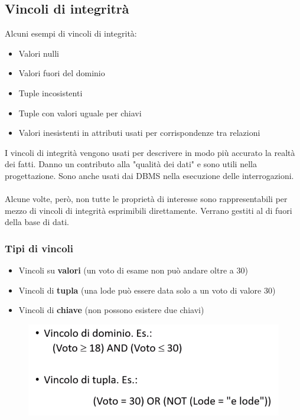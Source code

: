\documentclass[12pt, a4paper]{article}
\begin{document}
    \subsection{Vincoli di integritrà}
    Alcuni esempi di vincoli di integrità:
    \begin{itemize}
        \item Valori nulli
        \item Valori fuori del dominio
        \item Tuple incosistenti 
        \item Tuple con valori uguale per chiavi
        \item Valori inesistenti in attributi usati per corrispondenze tra relazioni
    \end{itemize}
    I vincoli di integrità vengono usati per descrivere in modo più accurato la realtà dei fatti.
    Danno un contributo alla "qualità dei dati" e sono utili nella progettazione. 
    Sono anche usati dai DBMS nella esecuzione delle interrogazioni.
    \\\\Alcune volte, però, non tutte le proprietà di interesse sono rappresentabili per mezzo di vincoli 
    di integrità esprimibili direttamente. Verrano gestiti al di fuori della base di dati. 
    \newpage
    \subsubsection*{Tipi di vincoli}
    \begin{itemize}
        \item Vincoli su \textbf{valori} (un voto di esame non può andare oltre a 30)
        \item Vincoli di \textbf{tupla} (una lode può essere data solo a un voto di valore 30)
        \item Vincoli di \textbf{chiave} (non possono esistere due chiavi)
    \end{itemize}
    \begin{figure}[htbp]
        \centering
        \includegraphics[scale=0.5]{vincoli.png}
        
    \end{figure}
\end{document}
